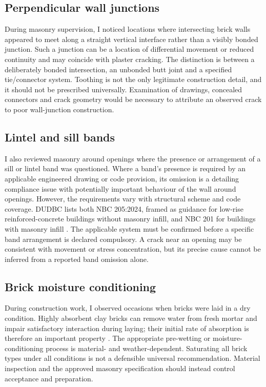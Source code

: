 \subsection{Perpendicular wall junctions}
During masonry supervision, I noticed locations where intersecting brick walls appeared to meet along a straight vertical interface rather than a visibly bonded junction. Such a junction can be a location of differential movement or reduced continuity and may coincide with plaster cracking. The distinction is between a deliberately bonded intersection, an unbonded butt joint and a specified tie/connector system. Toothing is not the only legitimate construction detail, and it should not be prescribed universally. Examination of drawings, concealed connectors and crack geometry would be necessary to attribute an observed crack to poor wall-junction construction.

\subsection{Lintel and sill bands}
I also reviewed masonry around openings where the presence or arrangement of a sill or lintel band was questioned. Where a band's presence is required by an applicable engineered drawing or code provision, its omission is a detailing compliance issue with potentially important behaviour of the wall around openings. However, the requirements vary with structural scheme and code coverage. DUDBC lists both NBC 205:2024, framed as guidance for low-rise reinforced-concrete buildings without masonry infill, and NBC 201 for buildings with masonry infill \parencite{dudbc2024}. The applicable system must be confirmed before a specific band arrangement is declared compulsory. A crack near an opening may be consistent with movement or stress concentration, but its precise cause cannot be inferred from a reported band omission alone.

\subsection{Brick moisture conditioning}
During construction work, I observed occasions when bricks were laid in a dry condition. Highly absorbent clay bricks can remove water from fresh mortar and impair satisfactory interaction during laying; their initial rate of absorption is therefore an important property \parencite{bailey1990,bia2026}. The appropriate pre-wetting or moisture-conditioning process is material- and weather-dependent. Saturating all brick types under all conditions is not a defensible universal recommendation. Material inspection and the approved masonry specification should instead control acceptance and preparation.

